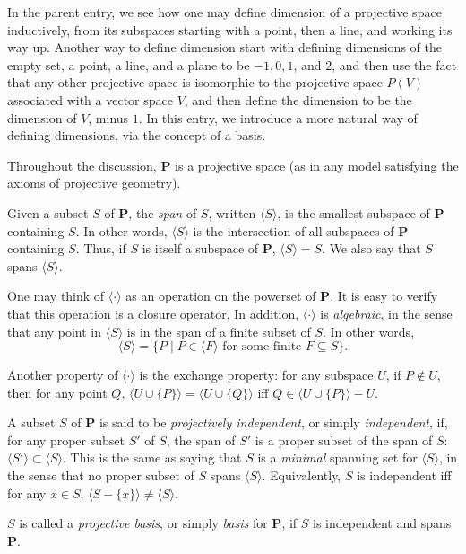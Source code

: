 \documentclass[12pt]{article}
\begin{document}
In the parent entry, we see how one may define dimension of a projective space inductively, from its subspaces starting with a point, then a line, and working its way up.  Another way to define dimension start with defining dimensions of the empty set, a point, a line, and a plane to be $-1,0,1$, and $2$, and then use the fact that any other projective space is isomorphic to the projective space $P(V)$ associated with a vector space $V$, and then define the dimension to be the dimension of $V$, minus $1$.  In this entry, we introduce a more natural way of defining dimensions, via the concept of a basis.

Throughout the discussion, $\mathbf{P}$ is a projective space (as in any model satisfying the axioms of projective geometry).

Given a subset $S$ of $\mathbf{P}$, the \emph{span} of $S$, written $\langle S \rangle$, is the smallest subspace of $\mathbf{P}$ containing $S$.  In other words, $\langle S\rangle$ is the intersection of all subspaces of $\mathbf{P}$ containing $S$.  Thus, if $S$ is itself a subspace of $\mathbf{P}$, $\langle S\rangle = S$.  We also say that $S$ spans $\langle S\rangle$.

One may think of $\langle \cdot \rangle$ as an operation on the powerset of $\mathbf{P}$.  It is easy to verify that this operation is a closure operator.  In addition, $\langle \cdot \rangle$ is \emph{algebraic}, in the sense that any point in $\langle S\rangle$ is in the span of a finite subset of $S$.  In other words, $$\langle S\rangle = \lbrace P\mid P\in \langle F\rangle\mbox{ for some finite }F\subseteq S\rbrace.$$

Another property of $\langle \cdot \rangle$ is the exchange property: for any subspace $U$, if $P\notin U$, then for any point $Q$, $\langle U\cup \lbrace P\rbrace \rangle = \langle U\cup \lbrace Q\rbrace \rangle$ iff $Q\in \langle U\cup \lbrace P\rbrace \rangle - U$.

A subset $S$ of $\mathbf{P}$ is said to be \emph{projectively independent}, or simply \emph{independent}, if, for any proper subset $S'$ of $S$, the span of $S'$ is a proper subset of the span of $S$: $\langle S'\rangle \subset \langle S\rangle$.  This is the same as saying that $S$ is a \emph{minimal} spanning set for $\langle S\rangle$, in the sense that no proper subset of $S$ spans $\langle S\rangle$.  Equivalently, $S$ is independent iff for any $x\in S$, $\langle S-\lbrace x\rbrace \rangle \ne \langle S\rangle$.

$S$ is called a \emph{projective basis}, or simply \emph{basis} for $\mathbf{P}$, if $S$ is independent and spans $\mathbf{P}$.
\end{document}
